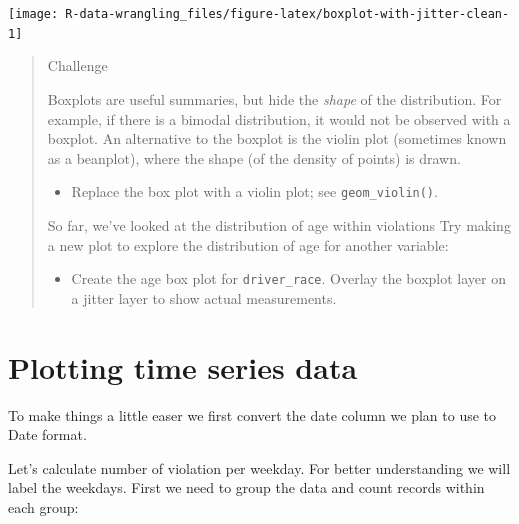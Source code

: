 \documentclass[]{book}
\newenvironment{Shaded}{\begin{snugshade}}{\end{snugshade}}
\newcommand{\KeywordTok}[1]{\textcolor[rgb]{0.13,0.29,0.53}{\textbf{#1}}}
\newcommand{\NormalTok}[1]{#1}
\newcommand{\OperatorTok}[1]{\textcolor[rgb]{0.81,0.36,0.00}{\textbf{#1}}}
\newcommand{\StringTok}[1]{\textcolor[rgb]{0.31,0.60,0.02}{#1}}
\providecommand{\tightlist}{%
  \setlength{\itemsep}{0pt}\setlength{\parskip}{0pt}}
\begin{document}
\texttt{[image: R-data-wrangling\_files/figure-latex/boxplot-with-jitter-clean-1]}

\begin{quote}
Challenge

Boxplots are useful summaries, but hide the \emph{shape} of the distribution. For
example, if there is a bimodal distribution, it would not be observed with a
boxplot. An alternative to the boxplot is the violin plot (sometimes known as a
beanplot), where the shape (of the density of points) is drawn.

\begin{itemize}
\tightlist
\item
  Replace the box plot with a violin plot; see \texttt{geom\_violin()}.
\end{itemize}

So far, we've looked at the distribution of age within violations Try making a
new plot to explore the distribution of age for another variable:

\begin{itemize}
\tightlist
\item
  Create the age box plot for \texttt{driver\_race}. Overlay the boxplot layer on a jitter layer to show actual measurements.
\end{itemize}
\end{quote}

\hypertarget{plotting-time-series-data}{%
\section{Plotting time series data}\label{plotting-time-series-data}}

To make things a little easer we first convert the date column we plan to use to Date format.

\begin{Shaded}
\end{Shaded}

Let's calculate number of violation per weekday. For better understanding we will label the weekdays. First we need to group the data and count records within each group:
\end{document}
